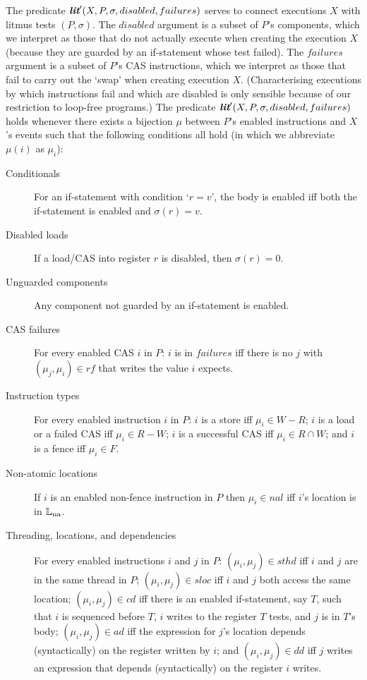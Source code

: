 \begin{definition} 
\label{def:lit}
%
The predicate $\textbf{\itshape lit}'(X, P, \sigma, disabled, failures)$ serves to
connect executions $X$ with litmus tests $(P,\sigma)$. The $disabled$
argument is a subset of $P$'s components, which we interpret as those
that do not actually execute when creating the execution $X$ (because
they are guarded by an if-statement whose test failed). The $failures$
argument is a subset of $P$'s CAS instructions, which we interpret as
those that fail to carry out the `swap' when creating execution $X$.
(Characterising executions by which instructions fail and which are
disabled is only sensible because of our restriction to loop-free
programs.) The predicate $\textbf{\itshape lit}'(X,P,\sigma,disabled,failures)$ holds
whenever there exists a bijection $\mu$ between $P$'s enabled
instructions and $X$'s events such that the following conditions all
hold (in which we abbreviate $\mu(i)$ as $\mu_i$):
%
\begin{description}

\item[Conditionals] For an if-statement with condition `$r=v$', the
body is enabled iff both the if-statement is enabled and
$\sigma(r) = v$.

\item[Disabled loads] If a load/CAS into register $r$ is disabled,
then $\sigma(r)=0$.

\item[Unguarded components] Any component not guarded by an
if-statement is enabled.

\item[CAS failures] For every enabled CAS $i$ in $P$: $i$ is in
$failures$ iff there is no $j$ with
$(\mu_j,\mu_i)\in{rf}$ that writes the value $i$
expects.

\item[Instruction types] For every enabled instruction $i$ in $P$: $i$
is a store iff $\mu_i\in {W}-{R}$; $i$ is a load or
a failed CAS iff $\mu_i\in {R}-{W}$; $i$ is a
successful CAS iff $\mu_i\in {R}\cap {W}$; and $i$
is a fence iff $\mu_i\in {F}$.

\item[Non-atomic locations] If $i$ is an enabled non-fence instruction
in $P$ then $\mu_i\in {nal}$ iff $i$'s location is in
$\mathbb{L}_{\rm na}$.

\item[Threading, locations, and dependencies] For every enabled
instructions $i$ and $j$ in $P$: $(\mu_i,\mu_j)\in {sthd}$ iff $i$ and
$j$ are in the same thread in $P$; $(\mu_i,\mu_j)\in {sloc}$ iff $i$
and $j$ both access the same location; $(\mu_i,\mu_j)\in {cd}$ iff
there is an enabled if-statement, say $T$, such that $i$ is sequenced
before $T$, $i$ writes to the register $T$ tests, and $j$ is in $T$'s
body; $(\mu_i,\mu_j)\in {ad}$ iff the expression for $j$'s location
depends (syntactically) on the register written by $i$; and
$(\mu_i,\mu_j)\in {dd}$ iff $j$ writes an expression that depends
(syntactically) on the register $i$ writes.


\end{description}
\end{definition}
